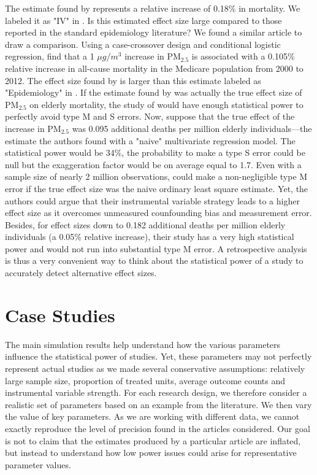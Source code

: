 \documentclass[12pt]{article}
\begin{document}
    The estimate found by \cite{deryugina_mortality_2019} represents a relative increase of 0.18\% in mortality. We labeled it as "IV" in . Is this estimated effect size large compared to those reported in the standard epidemiology literature? We found a similar article to draw a comparison. Using a case-crossover design and conditional logistic regression, \cite{di_association_2017} find that a 1 $\mu g /m^3$ increase in PM$_{2.5}$ is associated with a 0.105\% relative increase in all-cause mortality in the Medicare population from 2000 to 2012. The effect size found by \cite{deryugina_mortality_2019} is larger than this estimate labeled as "Epidemiology" in . If the estimate found by \cite{di_association_2017} was actually the true effect size of PM$_{2.5}$ on elderly mortality, the study of \cite{deryugina_mortality_2019} would have enough statistical power to perfectly avoid type M and S errors. Now, suppose that the true effect of the increase in PM$_{2.5}$ was 0.095 additional deaths per million elderly individuals---the estimate the authors found with a "naive" multivariate regression model. The statistical power would be 34\%, the probability to make a type S error could be null but the exaggeration factor would be on average equal to 1.7. Even with a sample size of nearly 2 million observations, \cite{deryugina_mortality_2019} could make a non-negligible type M error if the true effect size was the naive ordinary least square estimate. Yet, the authors could argue that their instrumental variable strategy leads to a higher effect size as it overcomes unmeasured counfounding bias and measurement error. Besides, for effect sizes down to 0.182 additional deaths per million elderly individuals (a 0.05\% relative increase), their study has a very high statistical power and would not run into substantial type M error. A retrospective analysis is thus a very convenient way to think about the statistical power of a study to accurately detect alternative effect sizes.

    \section{Case Studies}  \label{case_studies}

        The main simulation results help understand how the various parameters influence the statistical power of studies. Yet, these parameters may not perfectly represent actual studies as we made several conservative assumptions: relatively large sample size, proportion of treated units, average outcome counts and instrumental variable strength. For each research design, we therefore consider a realistic set of parameters based on an example from the literature. We then vary the value of key parameters. As we are working with different data, we cannot exactly reproduce the level of precision found in the articles considered. Our goal is not to claim that the estimates produced by a particular article are inflated, but instead to understand how low power issues could arise for representative parameter values.
            
\end{document}
